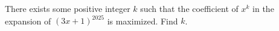 There exists some positive integer $k$ such that the coefficient of $x^k$ in the expansion of $(3x+1)^{2025}$ is maximized. Find $k$.

